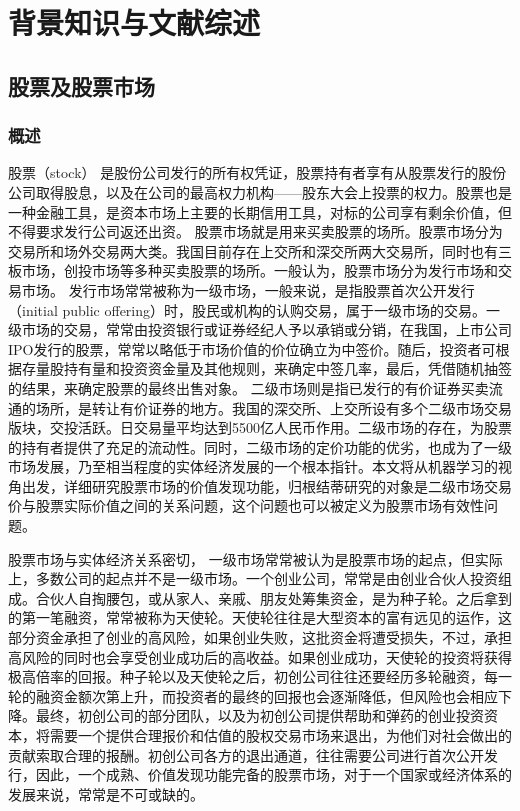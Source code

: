 \documentclass[twoside,longtitle]{LZUthesis}
\begin{document}
\chapter{背景知识与文献综述}
\section{股票及股票市场}
\subsection{概述}
股票（stock）\cite{xiaoyimin1996} 是股份公司发行的所有权凭证，股票持有者享有从股票发行的股份公司取得股息，以及在公司的最高权力机构——股东大会上投票的权力。股票也是一种金融工具，是资本市场上主要的长期信用工具，对标的公司享有剩余价值，但不得要求发行公司返还出资。
股票市场就是用来买卖股票的场所。股票市场分为交易所和场外交易两大类。我国目前存在上交所和深交所两大交易所，同时也有三板市场，创投市场等多种买卖股票的场所。一般认为，股票市场分为发行市场和交易市场。
发行市场常常被称为一级市场，一般来说，是指股票首次公开发行（initial public offering）时，股民或机构的认购交易，属于一级市场的交易。一级市场的交易，常常由投资银行或证券经纪人予以承销或分销，在我国，上市公司IPO发行的股票，常常以略低于市场价值的价位确立为中签价。随后，投资者可根据存量股持有量和投资资金量及其他规则，来确定中签几率，最后，凭借随机抽签的结果，来确定股票的最终出售对象。
二级市场则是指已发行的有价证券买卖流通的场所，是转让有价证券的地方。我国的深交所、上交所设有多个二级市场交易版块，交投活跃。日交易量平均达到5500亿人民币作用。二级市场的存在，为股票的持有者提供了充足的流动性。同时，二级市场的定价功能的优劣，也成为了一级市场发展，乃至相当程度的实体经济发展的一个根本指针。本文将从机器学习的视角出发，详细研究股票市场的价值发现功能，归根结蒂研究的对象是二级市场交易价与股票实际价值之间的关系问题，这个问题也可以被定义为股票市场有效性问题。

股票市场与实体经济关系密切，
一级市场常常被认为是股票市场的起点，但实际上，多数公司的起点并不是一级市场。一个创业公司，常常是由创业合伙人投资组成。合伙人自掏腰包，或从家人、亲戚、朋友处筹集资金，是为种子轮。之后拿到的第一笔融资，常常被称为天使轮。天使轮往往是大型资本的富有远见的运作，这部分资金承担了创业的高风险，如果创业失败，这批资金将遭受损失，不过，承担高风险的同时也会享受创业成功后的高收益。如果创业成功，天使轮的投资将获得极高倍率的回报。种子轮以及天使轮之后，初创公司往往还要经历多轮融资，每一轮的融资金额次第上升，而投资者的最终的回报也会逐渐降低，但风险也会相应下降。最终，初创公司的部分团队，以及为初创公司提供帮助和弹药的创业投资资本，将需要一个提供合理报价和估值的股权交易市场来退出，为他们对社会做出的贡献索取合理的报酬。初创公司各方的退出通道，往往需要公司进行首次公开发行，因此，一个成熟、价值发现功能完备的股票市场，对于一个国家或经济体系的发展来说，常常是不可或缺的。
\end{document}
